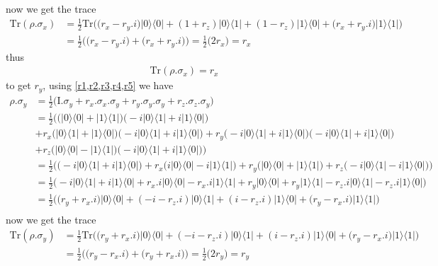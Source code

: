 \documentclass{article}
\newcommand{\op}[2]{|#1\rangle \langle#2|}
\begin{document}
now we get the trace
\begin{align*}
    \text{Tr}(\rho.\sigma_{x}) &= \frac{1}{2}\text{Tr}\bigg(\big( r_x - r_y.i \big)\op{0}{0} + (1 + r_z)\op{0}{1} + (1 - r_z)\op{1}{0} + \big( r_x + r_y.i \big)\op{1}{1}\bigg) \\
    &= \frac{1}{2}\bigg(\big( r_x - r_y.i \big) + \big( r_x + r_y.i \big)\bigg) = \frac{1}{2}\big(2r_x\big) = r_x
\end{align*}
thus
\begin{align*}
    \boxed{\text{Tr}(\rho.\sigma_{x}) = r_x}
\end{align*}
to get $r_y$, using \cref{r1,r2,r3,r4,r5} we have
\begin{align*}
    \rho.\sigma_{y} &= \frac{1}{2}\big(\text{I}.\sigma_{y} + r_x.\sigma_x.\sigma_y + r_y.\sigma_y.\sigma_y + r_z.\sigma_z.\sigma_y \big) \\
    &= \frac{1}{2}\bigg(\big(\op{0}{0} + \op{1}{1}\big)\big(-i\op{0}{1} + i\op{1}{0}\big) \\
    &+ r_x\big(\op{0}{1} + \op{1}{0}\big)\big(-i\op{0}{1} + i\op{1}{0}\big) + r_y\big(-i\op{0}{1} + i\op{1}{0}\big)\big(-i\op{0}{1} + i\op{1}{0}\big) \\
    &+ r_z\big(\op{0}{0} - \op{1}{1}\big)\big(-i\op{0}{1} + i\op{1}{0}\big)\bigg) \\
    &= \frac{1}{2}\bigg(\big(-i\op{0}{1} + i\op{1}{0}\big) + r_x\big(i\op{0}{0} -i \op{1}{1}\big) + r_y\big(\op{0}{0} + \op{1}{1}\big) + r_z\big(-i\op{0}{1} - i\op{1}{0}\big)\bigg) \\
    &= \frac{1}{2}\bigg(-i\op{0}{1} + i\op{1}{0} + r_x.i\op{0}{0} - r_x.i \op{1}{1} + r_y\op{0}{0} + r_y\op{1}{1} - r_z.i\op{0}{1} - r_z.i\op{1}{0}\bigg) \\
    &= \frac{1}{2}\bigg(\big( r_y + r_x.i \big)\op{0}{0} + (-i - r_z.i)\op{0}{1} + (i - r_z.i)\op{1}{0} + \big( r_y - r_x.i \big)\op{1}{1}\bigg) \\
\end{align*}
now we get the trace
\begin{align*}
    \text{Tr}(\rho.\sigma_{y}) &= \frac{1}{2}\text{Tr}\bigg(\big( r_y + r_x.i \big)\op{0}{0} + (-i - r_z.i)\op{0}{1} + (i - r_z.i)\op{1}{0} + \big( r_y - r_x.i \big)\op{1}{1}\bigg) \\
    &= \frac{1}{2}\bigg(\big( r_y - r_x.i \big) + \big( r_y + r_x.i \big)\bigg) = \frac{1}{2}\big(2r_y\big) = r_y
\end{align*}
\end{document}

